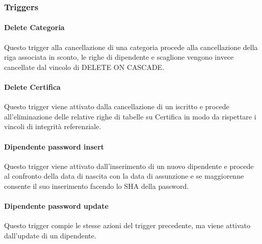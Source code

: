 


\subsubsection{Triggers}

\paragraph*{Delete Categoria}

Questo trigger alla cancellazione di una categoria procede alla cancellazione della riga associata in sconto, le righe di dipendente e scaglione vengono invece cancellate dal vincolo di DELETE ON CASCADE.



\paragraph*{Delete Certifica}

Questo trigger viene attivato dalla cancellazione di un iscritto e procede all'eliminazione delle relative righe di tabelle su Certifica in modo da rispettare i vincoli di integrit\`a referenziale.



\paragraph*{Dipendente password insert}

Questo trigger viene attivato dall'inserimento di un nuovo dipendente e procede al confronto della data di nascita con la data di assunzione e se maggiorenne consente il suo inserimento facendo lo SHA della password.



\paragraph*{Dipendente password update}

Questo trigger compie le stesse azioni del trigger precedente, ma viene attivato dall'update di un dipendente.

